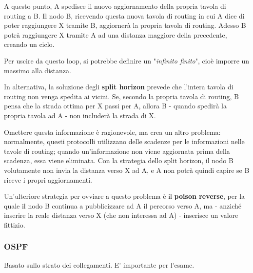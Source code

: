                 A questo punto, A spedisce il nuovo aggiornamento della propria tavola di routing a B. Il nodo B, ricevendo questa nuova tavola di routing in cui A dice di poter raggiungere X tramite B, aggiornerà la propria tavola di routing. Adesso B potrà raggiungere X tramite A ad una distanza maggiore della precedente, creando un ciclo.
                
                \vspace{3mm}
                
                Per uscire da questo loop, si potrebbe definire un "\textit{infinito finito}", cioè imporre un massimo alla distanza. 
                
                In alternativa, la soluzione degli \textbf{split horizon} prevede che l'intera tavola di routing non venga spedita ai vicini. Se, secondo la propria tavola di routing, B pensa che la strada ottima per X passi per A, allora B - quando spedirà la propria tavola ad A - non includerà la strada di X. 
                
                \vspace{3mm}
                
                Omettere questa informazione è ragionevole, ma crea un altro problema: normalmente, questi protocolli utilizzano delle scadenze per le informazioni nelle tavole di routing; quando un'informazione non viene aggiornata prima della scadenza, essa viene eliminata. Con la strategia dello split horizon, il nodo B volutamente non invia la distanza verso X ad A, e A non potrà quindi capire se B riceve i propri aggiornamenti.
                
                \vspace{3mm}
                
                Un'ulteriore strategia per ovviare a questo problema è il \textbf{poison reverse}, per la quale il nodo B continua a pubblicizzare ad A il percorso verso A, ma - anziché inserire la reale distanza verso X (che non interessa ad A) - inserisce un valore fittizio.
                
        \subsubsection{OSPF}
        
            Basato sullo strato dei collegamenti. E' importante per l'esame.
            
            \vspace{3mm}
            
